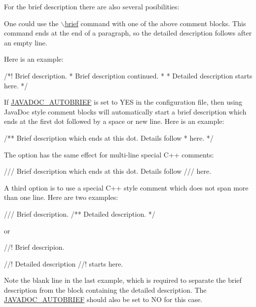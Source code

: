 For the brief description there are also several posibilities: 
\begin{DoxyEnumerate}
\item One could use the \hyperlink{commands_cmdbrief}{$\backslash$brief} command with one of the above comment blocks. This command ends at the end of a paragraph, so the detailed description follows after an empty line.

Here is an example:

\begin{DoxyVerb}
/*! \brief Brief description.
 *         Brief description continued.
 *
 *  Detailed description starts here.
 */
\end{DoxyVerb}



\item If \hyperlink{config_cfg_javadoc_autobrief}{JAVADOC\_\-AUTOBRIEF} is set to {\ttfamily YES} in the configuration file, then using JavaDoc style comment blocks will automatically start a brief description which ends at the first dot followed by a space or new line. Here is an example:

\begin{DoxyVerb}
/** Brief description which ends at this dot. Details follow
 *  here.
 */
\end{DoxyVerb}
 The option has the same effect for multi-\/line special C++ comments: \begin{DoxyVerb}
/// Brief description which ends at this dot. Details follow
/// here.
\end{DoxyVerb}



\item A third option is to use a special C++ style comment which does not span more than one line. Here are two examples: \begin{DoxyVerb}
/// Brief description.
/** Detailed description. */
\end{DoxyVerb}


or

\begin{DoxyVerb}
//! Brief descripion.

//! Detailed description 
//! starts here.
\end{DoxyVerb}


Note the blank line in the last example, which is required to separate the brief description from the block containing the detailed description. The \hyperlink{config_cfg_javadoc_autobrief}{JAVADOC\_\-AUTOBRIEF} should also be set to {\ttfamily NO} for this case.


\end{DoxyEnumerate}

